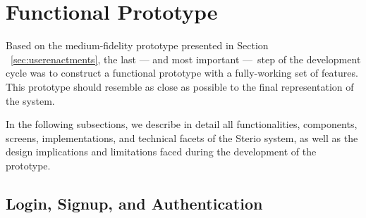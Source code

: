 
\section{Functional Prototype}

Based on the medium-fidelity prototype presented in Section ~\ref{sec:userenactments}, the last — and most important — step of the development cycle was to construct a functional prototype with a fully-working set of features. This prototype should resemble as close as possible to the final representation of the system. 

In the following subsections, we describe in detail all functionalities, components, screens, implementations, and technical facets of the Sterio system, as well as the design implications and limitations faced during the development of the prototype.

\subsection{Login, Signup, and Authentication}

